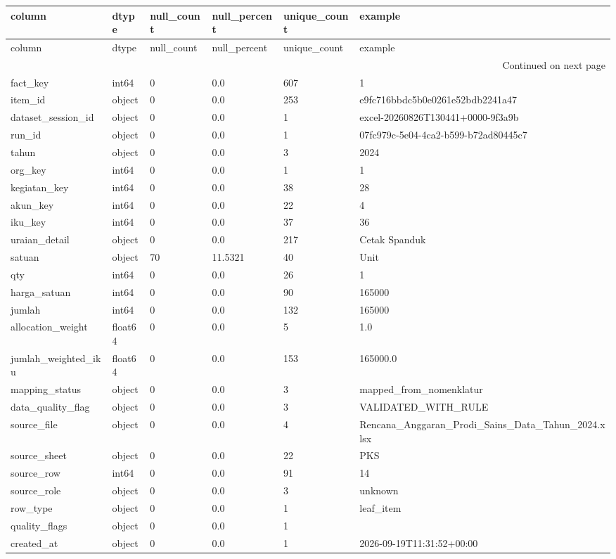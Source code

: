 \begingroup
\scriptsize
\begin{longtable}{llllll}
\toprule
column & dtype & null_count & null_percent & unique_count & example \\
\midrule
\endfirsthead
\toprule
column & dtype & null_count & null_percent & unique_count & example \\
\midrule
\endhead
\midrule
\multicolumn{6}{r}{Continued on next page} \\
\midrule
\endfoot
\bottomrule
\endlastfoot
fact_key & int64 & 0 & 0.0 & 607 & 1 \\
item_id & object & 0 & 0.0 & 253 & e9fc716bbdc5b0e0261e52bdb2241a47 \\
dataset_session_id & object & 0 & 0.0 & 1 & excel-20260826T130441+0000-9f3a9b \\
run_id & object & 0 & 0.0 & 1 & 07fc979c-5e04-4ca2-b599-b72ad80445c7 \\
tahun & object & 0 & 0.0 & 3 & 2024 \\
org_key & int64 & 0 & 0.0 & 1 & 1 \\
kegiatan_key & int64 & 0 & 0.0 & 38 & 28 \\
akun_key & int64 & 0 & 0.0 & 22 & 4 \\
iku_key & int64 & 0 & 0.0 & 37 & 36 \\
uraian_detail & object & 0 & 0.0 & 217 & Cetak Spanduk \\
satuan & object & 70 & 11.5321 & 40 & Unit \\
qty & int64 & 0 & 0.0 & 26 & 1 \\
harga_satuan & int64 & 0 & 0.0 & 90 & 165000 \\
jumlah & int64 & 0 & 0.0 & 132 & 165000 \\
allocation_weight & float64 & 0 & 0.0 & 5 & 1.0 \\
jumlah_weighted_iku & float64 & 0 & 0.0 & 153 & 165000.0 \\
mapping_status & object & 0 & 0.0 & 3 & mapped_from_nomenklatur \\
data_quality_flag & object & 0 & 0.0 & 3 & VALIDATED_WITH_RULE \\
source_file & object & 0 & 0.0 & 4 & Rencana_Anggaran_Prodi_Sains_Data_Tahun_2024.xlsx \\
source_sheet & object & 0 & 0.0 & 22 & PKS \\
source_row & int64 & 0 & 0.0 & 91 & 14 \\
source_role & object & 0 & 0.0 & 3 & unknown \\
row_type & object & 0 & 0.0 & 1 & leaf_item \\
quality_flags & object & 0 & 0.0 & 1 &  \\
created_at & object & 0 & 0.0 & 1 & 2026-09-19T11:31:52+00:00 \\
\end{longtable}
\endgroup
